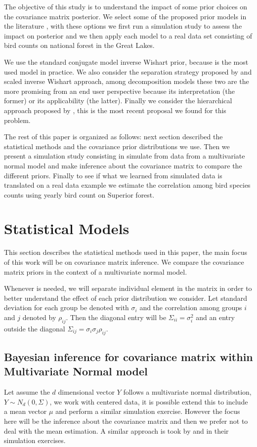 \documentclass{article}
\begin{document}
The objective of this study is to understand the impact of some prior choices on the covariance matrix posterior. We select some of the proposed prior models in the literature , with these options we first run a simulation study to assess the impact on posterior and we then apply each model  to a real data set consisting of bird counts on national forest in the Great Lakes. 

We use the standard conjugate model inverse Wishart prior, because is the most used model in practice. We also consider the separation strategy proposed by  \cite{barnard2000} and scaled inverse Wishart approach, among decomposition models these two are the more promising from an end user perspective because its interpretation (the former) or its applicability (the latter). Finally we consider the hierarchical approach proposed by \cite{huang2013simple}, this is the most recent proposal we found for this problem. 

The rest of this paper is organized as follows: next section described the statistical methods and the covariance prior distributions we use. Then we present a simulation study consisting in simulate from data from a multivariate normal model and make inference about the covariance matrix to compare the different priors. Finally to see if what we learned from simulated data is translated on a real data example we estimate the correlation among bird species counts using yearly bird count on Superior forest. 

\section{Statistical Models}

This section describes the statistical methods used in this paper, the main focus of this work will be on covariance matrix inference.  We compare the covariance matrix priors in the context of a  multivariate normal model. 

Whenever is needed, we will separate individual element in the matrix in order to better understand the effect of each prior distribution we consider. Let standard deviation for each group be denoted with $\sigma_i$ and the correlation among groups $i$ and $j$ denoted by $\rho_{ij}$. Then the diagonal entry will be $\Sigma_{ii} = \sigma_i^2$ and an entry outside the diagonal $\Sigma_{ij} = \sigma_i\sigma_j\rho_{ij}$. 


\subsection{Bayesian inference for covariance matrix within Multivariate Normal model }
 Let assume the $d$ dimensional vector $Y$ follows a multivariate normal distribution, $Y \sim N_d(0, \Sigma)$, we work with centered data, it is possible extend this to include a mean vector $\mu$ and perform a similar simulation exercise. However the focus here will be the inference about the covariance matrix and then we prefer not to deal with the mean estimation. A similar approach is took by  \cite{daniels1999}
and \cite{matilde} in their simulation exercises.
 
\end{document}
